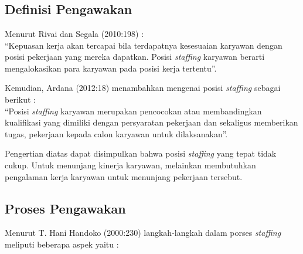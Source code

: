\chapter{\babDua}


\section{Definisi Pengawakan}

Menurut Rivai dan Segala (2010:198) :
\\
“Kepuasan kerja akan tercapai bila terdapatnya kesesuaian karyawan dengan posisi pekerjaan yang mereka dapatkan. Posisi \textit{staffing} karyawan berarti mengalokasikan para karyawan pada posisi kerja tertentu”\cite{2}.

Kemudian, Ardana (2012:18) menambahkan mengenai posisi \textit{staffing} sebagai berikut : 
\\
“Posisi \textit{staffing} karyawan merupakan pencocokan atau membandingkan kualifikasi yang dimiliki dengan persyaratan pekerjaan dan sekaligus memberikan tugas, pekerjaan kepada calon karyawan untuk dilaksanakan”\cite{2}.

Pengertian diatas dapat disimpulkan bahwa posisi \textit{staffing}  yang tepat tidak cukup. Untuk menunjang kinerja karyawan, melainkan membutuhkan pengalaman kerja karyawan untuk menunjang pekerjaan tersebut.  




\section{Proses Pengawakan}

Menurut T. Hani Handoko (2000:230) langkah-langkah dalam porses \textit{staffing} meliputi beberapa aspek yaitu \cite{3}: 

